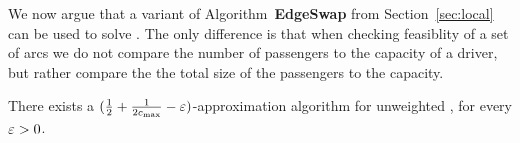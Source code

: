 
We now argue that a variant of Algorithm~\textbf{EdgeSwap} from
Section~\ref{sec:local} can be used to solve \gcp.
%
The only difference is that when checking feasiblity of a set of arcs
we do not compare the number of passengers to the capacity of a
driver, but rather compare the the total size of the passengers to the
capacity.

\begin{theorem}
There exists a $(\frac{1}{2} + \frac{1}{2c_{\max}} - \varepsilon)$-approximation algorithm
for unweighted \gcp, for every $\varepsilon>0$.
\end{theorem}

